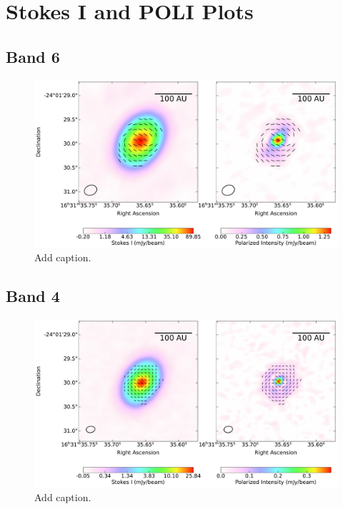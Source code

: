 \chapter{Stokes I and POLI Plots}
\label{ch2}

\section{Band 6}
\begin{figure}[h]
  \centering
  \includegraphics[width=1.1\textwidth]{WRITEUP_AND_IMAGES/IMAGES/IRS63_StokesI_POLI_vectors_BAND6.pdf}
  \caption{Add caption.}
  \label{fig: }
\end{figure}

\section{Band 4}
\begin{figure}[h]
  \centering
  \includegraphics[width=1.1\textwidth]{WRITEUP_AND_IMAGES/IMAGES/IRS63_StokesI_POLI_vectors_BAND4.pdf}
  \caption{Add caption.}
  \label{fig: }
\end{figure}
